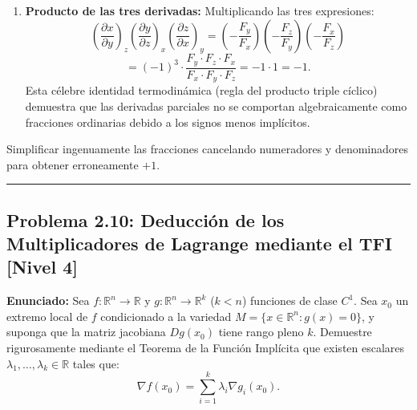 \documentclass[11pt,a4paper]{article}
\begin{document}
\begin{enumerate}[label=\textbf{\arabic*.}]
\item \textbf{Producto de las tres derivadas:}
Multiplicando las tres expresiones:
\begin{equation*}
\left(\frac{\partial x}{\partial y}\right)_z \left(\frac{\partial y}{\partial z}\right)_x \left(\frac{\partial z}{\partial x}\right)_y = \left(-\frac{F_y}{F_x}\right) \left(-\frac{F_z}{F_y}\right) \left(-\frac{F_x}{F_z}\right)
\end{equation*}
\begin{equation*}
= (-1)^3 \cdot \frac{F_y \cdot F_z \cdot F_x}{F_x \cdot F_y \cdot F_z} = -1 \cdot 1 = -1.
\end{equation*}
Esta célebre identidad termodinámica (regla del producto triple cíclico) demuestra que las derivadas parciales no se comportan algebraicamente como fracciones ordinarias debido a los signos menos implícitos.
\end{enumerate}

\begin{trapbox}
Simplificar ingenuamente las fracciones cancelando numeradores y denominadores para obtener erroneamente $+1$.
\end{trapbox}

\vspace{0.5cm}
\hrule
\vspace{0.5cm}

\subsection*{Problema 2.10: Deducción de los Multiplicadores de Lagrange mediante el TFI \hfill \color{primaryblue}\small[Nivel 4]}

\begin{tcolorbox}[colback=white,colframe=gray!40,arc=1mm,boxrule=0.5pt,left=3mm,right=3mm,top=2mm,bottom=2mm]
\textbf{Enunciado:} Sea $f: \mathbb{R}^n \to \mathbb{R}$ y $g: \mathbb{R}^n \to \mathbb{R}^k$ ($k < n$) funciones de clase $C^1$. Sea $x_0$ un extremo local de $f$ condicionado a la variedad $M = \{x \in \mathbb{R}^n : g(x) = 0\}$, y suponga que la matriz jacobiana $Dg(x_0)$ tiene rango pleno $k$. Demuestre rigurosamente mediante el Teorema de la Función Implícita que existen escalares $\lambda_1, \dots, \lambda_k \in \mathbb{R}$ tales que:
\begin{equation*}
\nabla f(x_0) = \sum_{i=1}^k \lambda_i \nabla g_i(x_0).
\end{equation*}
\end{tcolorbox}
\end{document}

